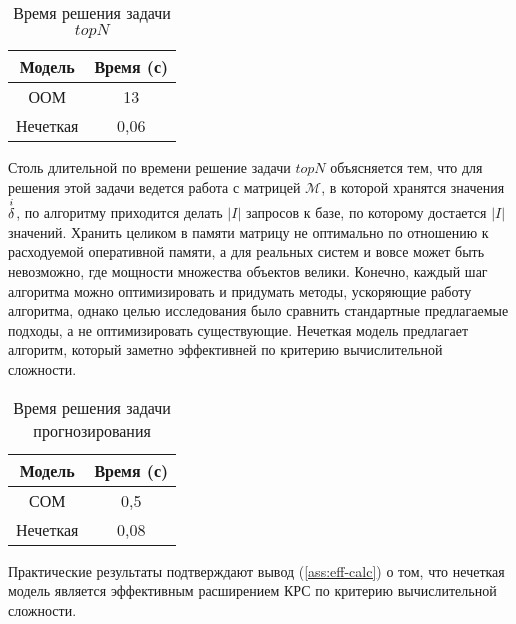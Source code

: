 \begin{table}[h]
	\caption{Время решения задачи $topN$}
  \begin{center}
	\label{table:time-topn}
	\begin{tabular}{|c|c|}
	  \hline
		Модель & Время (с)\\ \hline
		ООМ& 13\\ \hline
		Нечеткая&0,06 \\ \hline
	\end{tabular}
  \end{center}
\end{table}
Столь длительной по времени решение задачи $topN$
объясняется тем, что для решения этой задачи ведется работа
с матрицей $\mathcal{M}$, в которой хранятся значения
${\overset{i}{\mathcal{\delta}}}$, по алгоритму приходится делать $|I|$ запросов к базе, по которому
достается $|I|$ значений. Хранить целиком в памяти матрицу не оптимально по
отношению к расходуемой оперативной памяти, а для реальных систем и вовсе может
быть невозможно, где мощности множества объектов велики. Конечно,
каждый шаг алгоритма можно оптимизировать и придумать методы, ускоряющие
работу алгоритма, однако целью исследования было сравнить стандартные
предлагаемые подходы, а не оптимизировать существующие. Нечеткая модель
предлагает алгоритм, который заметно эффективней по критерию вычислительной
сложности.

\begin{table}[h]
\caption{Время решения задачи прогнозирования}
  \begin{center}
	\label{table:time-p}
	\begin{tabular}{|c|c|}
	  \hline
		Модель & Время (с)\\ \hline
		СОМ& 0,5\\ \hline
		Нечеткая&0,08 \\ \hline
	\end{tabular}
  \end{center}
\end{table}

Практические результаты подтверждают вывод (\ref{ass:eff-calc}) о том, что нечеткая модель является
эффективным расширением КРС по критерию вычислительной сложности.
